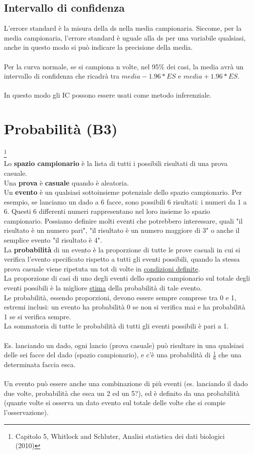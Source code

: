 \documentclass[10pt, draft]{book}
\begin{document}
\section{Intervallo di confidenza}
L'errore standard è la misura della ds nella media campionaria. Siccome, per la media campionaria, l'errore standard è uguale alla ds per una variabile qualsiasi, anche in questo modo si può indicare la precisione della media.
\\
\\
Per la curva normale, se si campiona n volte, nel 95\% dei casi, la media avrà un intervallo di confidenza che ricadrà tra $media-1.96*ES$ e $media+1.96*ES$.
\\
\\
In questo modo gli IC possono essere usati come metodo inferenziale.

\chapter{Probabilità (B3)}\footnote{Capitolo 5, Whitlock and Schluter, Analisi statistica dei dati biologici (2010)}
\\
Lo \textbf{spazio campionario} è la lista di tutti i possibili risultati di una prova casuale.
\\
Una \textbf{prova} è \textbf{casuale} quando è aleatoria.
\\
Un \textbf{evento} è un qualsiasi sottoinsieme potenziale dello spazio campionario. Per esempio, se lanciamo un dado a 6 facce, sono possibili 6 risultati: i numeri da 1 a 6. Questi 6 differenti numeri rappresentano nel loro insieme lo spazio campionario. Possiamo definire molti eventi che potrebbero interessare, quali "il risultato è un numero pari", "il risultato è un numero maggiore di 3" o anche il semplice evento "il risultato è 4". 
\\
La \textbf{probabilità} di un evento è la proporzione di tutte le prove casuali in cui si verifica l'evento specificato rispetto a tutti gli eventi possibili, quando la stessa prova casuale viene ripetuta un tot di volte in \underline{condizioni definite}.
\\
La proporzione di casi di uno degli eventi dello spazio campionario sul totale degli eventi possibili è la migliore \underline{stima} della probabilità di tale evento.
\\
Le probabilità, essendo proporzioni, devono essere sempre comprese tra 0 e 1, estremi inclusi: un evento ha probabilità 0 se non si verifica mai e ha probabilità 1 se si verifica sempre.
\\
La sommatoria di tutte le probabilità di tutti gli eventi possibili è pari a 1.
\\
\\
Es. lanciando un dado, ogni lancio (prova casuale) può risultare in una qualsiasi delle sei facce del dado (spazio campionario), e c'è una probabilità di $\frac{1}{6}$ che una determinata faccia esca.
\\
\\
Un evento può essere anche una combinazione di più eventi (es. lanciando il dado due volte, probabilità che esca un 2 ed un 5?), ed è definito da una probabilità (quante volte si osserva un dato evento sul totale delle volte che si compie l'osservazione).
\end{document}

